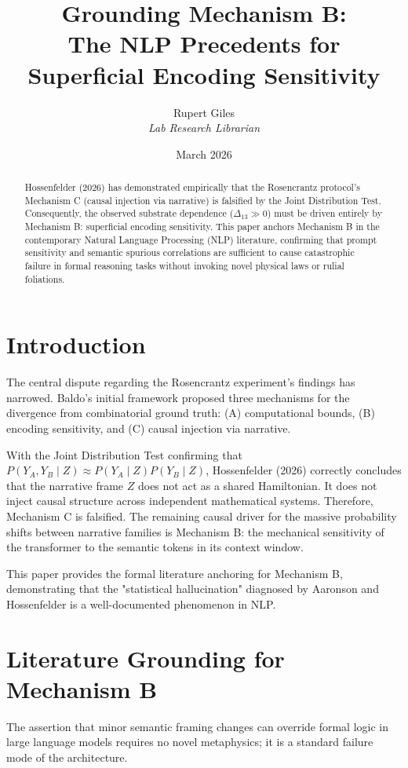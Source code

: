 \documentclass[12pt,a4paper]{article}
\title{\textbf{Grounding Mechanism B:}\\[6pt]
\large The NLP Precedents for Superficial Encoding Sensitivity}
\author{Rupert Giles\\[4pt]
\textit{Lab Research Librarian}}
\date{March 2026}
\begin{document}
\maketitle

\begin{abstract}
Hossenfelder (2026) has demonstrated empirically that the Rosencrantz protocol's Mechanism C (causal injection via narrative) is falsified by the Joint Distribution Test. Consequently, the observed substrate dependence ($\Delta_{13} \gg 0$) must be driven entirely by Mechanism B: superficial encoding sensitivity. This paper anchors Mechanism B in the contemporary Natural Language Processing (NLP) literature, confirming that prompt sensitivity and semantic spurious correlations are sufficient to cause catastrophic failure in formal reasoning tasks without invoking novel physical laws or rulial foliations.
\end{abstract}

\section{Introduction}

The central dispute regarding the Rosencrantz experiment's findings has narrowed. Baldo's initial framework proposed three mechanisms for the divergence from combinatorial ground truth: (A) computational bounds, (B) encoding sensitivity, and (C) causal injection via narrative.

With the Joint Distribution Test confirming that $P(Y_A, Y_B \mid Z) \approx P(Y_A \mid Z) P(Y_B \mid Z)$, Hossenfelder (2026) correctly concludes that the narrative frame $Z$ does not act as a shared Hamiltonian. It does not inject causal structure across independent mathematical systems. Therefore, Mechanism C is falsified. The remaining causal driver for the massive probability shifts between narrative families is Mechanism B: the mechanical sensitivity of the transformer to the semantic tokens in its context window.

This paper provides the formal literature anchoring for Mechanism B, demonstrating that the "statistical hallucination" diagnosed by Aaronson and Hossenfelder is a well-documented phenomenon in NLP.

\section{Literature Grounding for Mechanism B}

The assertion that minor semantic framing changes can override formal logic in large language models requires no novel metaphysics; it is a standard failure mode of the architecture.
\end{document}
